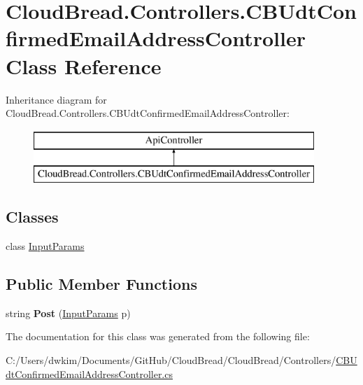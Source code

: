 \hypertarget{a00056}{}\section{Cloud\+Bread.\+Controllers.\+C\+B\+Udt\+Confirmed\+Email\+Address\+Controller Class Reference}
\label{a00056}
Inheritance diagram for Cloud\+Bread.\+Controllers.\+C\+B\+Udt\+Confirmed\+Email\+Address\+Controller\+:\begin{figure}[H]
\begin{center}
\leavevmode
\includegraphics[height=2.000000cm]{a00056}
\end{center}
\end{figure}
\subsection*{Classes}
\begin{DoxyCompactItemize}
\item 
class \hyperlink{a00105}{Input\+Params}
\end{DoxyCompactItemize}
\subsection*{Public Member Functions}
\begin{DoxyCompactItemize}
\item 
string {\bfseries Post} (\hyperlink{a00105}{Input\+Params} p)\hypertarget{a00056_a93380bf8890ef136fa3792a555002aa0}{}\label{a00056_a93380bf8890ef136fa3792a555002aa0}

\end{DoxyCompactItemize}


The documentation for this class was generated from the following file\+:\begin{DoxyCompactItemize}
\item 
C\+:/\+Users/dwkim/\+Documents/\+Git\+Hub/\+Cloud\+Bread/\+Cloud\+Bread/\+Controllers/\hyperlink{a00227}{C\+B\+Udt\+Confirmed\+Email\+Address\+Controller.\+cs}\end{DoxyCompactItemize}
